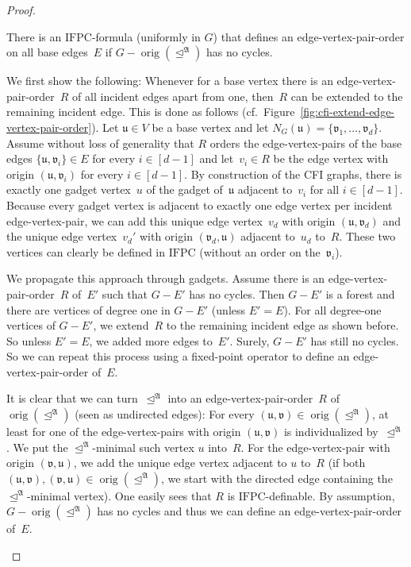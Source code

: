 \documentclass[]{lmcs}
\newcommand{\set}[1]{\lbrace #1 \rbrace}
\newcommand{\Struct}{\mathfrak{A}}
\newcommand{\vertA}{u}
\newcommand{\vertB}{v}
\newcommand{\neighbors}[2]{N_{#1}(#2)}
\newcommand{\IFPC}{\ensuremath{\mathrm{IFPC}}}
\newcommand{\orig}[1]{\operatorname{orig}(#1)}
\newcommand{\bVertA}{\mathfrak{u}}
\newcommand{\bVertB}{\mathfrak{v}}
\newcommand{\indRel}{\trianglelefteq}
\newenvironment{claimproof}[1][\proofname]{\begin{claimprooftemp}[#1]\renewcommand*{\qedsymbol}{\(\dashv\)}}{\end{claimprooftemp}}
\begin{document}
\begin{proof}
	
	\begin{clm}
		\label{clm:edge-vertex-pair-order-all}
		There is an \IFPC{}-formula (uniformly in $G$)
		that defines an edge-vertex-pair-order on all base edges~$E$
		if $G - \orig{\indRel^\Struct}$ has no cycles.
	\end{clm}
	\begin{claimproof}
		We first show the following:
		Whenever for a base vertex
		there is an edge-vertex-pair-order~$R$ of all 
		incident edges apart from one,
		then~$R$ can be extended to the remaining incident edge. This is done as follows (cf.~Figure~\ref{fig:cfi-extend-edge-vertex-pair-order}).
		Let $\bVertA \in V$ be a base vertex
		and let $\neighbors{G}{\bVertA} = \set{\bVertB_1, \dots, \bVertB_d}$.
		Assume without loss of generality that $R$ orders the edge-vertex-pairs of the base edges $\set{\bVertA,\bVertB_i} \in E$ for every $i \in [d-1]$
		and let~$\vertB_i \in R$ be the edge vertex with origin $(\bVertA,\bVertB_i)$ for every $i \in [d-1]$.
		By construction of the CFI graphs,
		there is exactly one gadget vertex~$\vertA$ of the gadget of~$\bVertA$
		adjacent to~$\vertB_i$ for all $i \in [d-1]$.
		Because every gadget vertex is adjacent to exactly one edge vertex per incident edge-vertex-pair,
		we can add this unique edge vertex~$\vertB_d$ with origin $(\bVertA, \bVertB_d)$  and the unique edge vertex~$\vertB_d'$
		with origin $(\bVertB_d, \bVertA)$ adjacent to~$\vertA_d$  to~$R$.
		These two vertices can clearly be defined in \IFPC{} (without an order on the~$\bVertB_i$).
		
		We propagate this approach through gadgets.
		Assume there is an edge-vertex-pair-order~$R$ of~$E'$
		such that $G - E'$ has no cycles.
		Then $G-E'$ is a forest and there are vertices of degree one in $G-E'$
		(unless $E' = E$).
		For all degree-one vertices of $G - E'$,
		we extend~$R$ to the remaining incident edge as shown before.
		So unless $E' = E$, we added more edges to~$E'$.
		Surely, $G -E'$ has still no cycles.
		So
		we can repeat this process using a fixed-point operator
		to define an edge-vertex-pair-order of~$E$.
		
		It is clear that we can turn~$\indRel^\Struct$ into an
		edge-vertex-pair-order~$R$ of $\orig{\indRel^\Struct}$ (seen as undirected edges):
		For every  $(\bVertA,\bVertB) \in \orig{\indRel^\Struct}$,
		at least for one of the edge-vertex-pairs with origin $(\bVertA,\bVertB)$
		is individualized by~$\indRel^\Struct$.
		We put the $\indRel^\Struct$-minimal such vertex $\vertA$ into~$R$.
		For the edge-vertex-pair with origin $(\bVertB,\bVertA)$, we add the unique edge vertex adjacent to $\vertA$ to~$R$
		(if both $(\bVertA,\bVertB),(\bVertB,\bVertA) \in \orig{\indRel^\Struct}$,
		we start with the directed edge containing the $\indRel^\Struct$\nobreakdash-minimal vertex).
		One easily sees that $R$ is \IFPC{}-definable.
		By assumption, $G-\orig{\indRel^\Struct}$ has no cycles
		and thus we can define an edge-vertex-pair-order of~$E$.
	\end{claimproof}



\end{proof}
\end{document}
